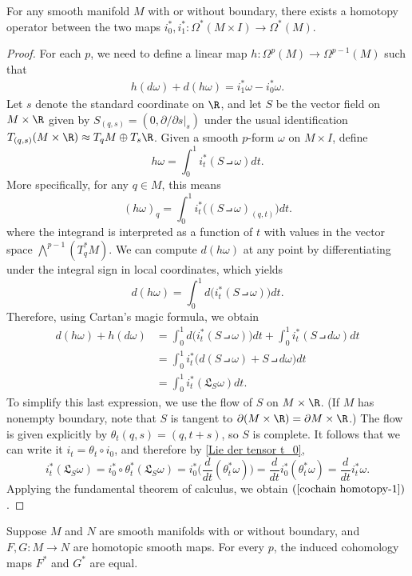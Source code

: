 \begin{lemma}
For any smooth manifold $M$ with or without boundary, there exists a homotopy operator between the two maps $i_0^*,i_1^*:\Omega^*(M\times I)\to\Omega^*(M)$.
\end{lemma}
\begin{proof}
For each $p$, we need to define a linear map $h:\Omega^p(M)\to\Omega^{p-1}(M)$ such that
\begin{align}\label{cochain homotopy-1}
h(d\omega)+d(h\omega)=i_1^*\omega-i_0^*\omega.
\end{align}
Let $s$ denote the standard coordinate on $\R$, and let $S$ be the vector field on $M\times\R$ given by $S_{(q,s)}=(0,\partial/\partial s|_s)$ under the usual identification $T_{(q,s)}(M\times\R)\approx T_qM\oplus T_s\R$. Given a smooth $p$-form $\omega$ on $M\times I$, define
\[h\omega=\int_{0}^{1}i_t^*(S\intprod\omega)dt.\]
More specifically, for any $q\in M$, this means
\[(h\omega)_q=\int_{0}^{1}i_t^*\big((S\intprod\omega)_{(q,t)}\big)dt.\]
where the integrand is interpreted as a function of $t$ with values in the vector space $\bigwedge^{p-1}(T^*_qM)$. We can compute $d(h\omega)$ at any point by differentiating under the integral sign in local coordinates, which yields
\[d(h\omega)=\int_{0}^{1}d\big(i_t^*(S\intprod\omega)\big)dt.\]
Therefore, using Cartan's magic formula, we obtain
\begin{align*}
d(h\omega)+h(d\omega)&=\int_{0}^{1}d\big(i_t^*(S\intprod\omega)\big)dt+\int_{0}^{1}i_t^*(S\intprod d\omega)dt\\
&=\int_{0}^{1}i_t^*\big(d(S\intprod\omega)+S\intprod d\omega\big)dt\\
&=\int_{0}^{1}i_t^*(\mathfrak{L}_S\omega)dt.
\end{align*}
To simplify this last expression, we use the flow of $S$ on $M\times\R$. (If $M$ has
nonempty boundary, note that $S$ is tangent to $\partial(M\times\R)=\partial M\times\R$.) The flow is given explicitly by $\theta_t(q,s)=(q,t+s)$, so $S$ is complete. 
It follows that we can write it $i_t=\theta_t\circ i_0$, and therefore by \cref{Lie der tensor t_0},
\[i_t^*(\mathfrak{L}_S\omega)=i_0^*\circ\theta_t^*(\mathfrak{L}_S\omega)=i_0^*\Big(\frac{d}{dt}(\theta_t^*\omega)\Big)=\frac{d}{dt}i_0^*(\theta_t^*\omega)=\frac{d}{dt}i_t^*\omega.\]
Applying the fundamental theorem of calculus, we obtain $(\ref{cochain homotopy-1})$.
\end{proof}
\begin{proposition}\label{cohomology homotopy map}
Suppose $M$ and $N$ are smooth manifolds with or without boundary, and $F,G:M\to N$ are homotopic smooth maps. For every $p$, the induced cohomology maps $F^*$ and $G^*$ are equal.
\end{proposition}
